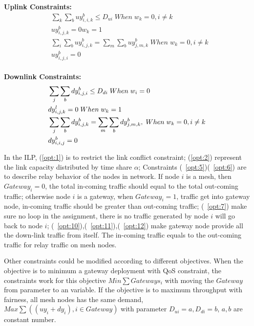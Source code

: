 \noindent
{\bf Uplink Constraints:} 
\begin{align}
\label{opt:3}
& \sum_k \sum_b uy_{i,i,k}^b \leq D_{ui} \; When \; w_k=0, i \neq k \\
\label{opt:4}
& uy_{i,j,k}^b = 0 w_k=1 \\
\label{opt:6}
& \sum_i\sum_b uy_{i,j,k}^b = \sum_m \sum_b uy_{j,m,k}^b \; When \; w_k=0, i \neq k\\
\label{opt:7}
& uy_{i,j,i}^b=0 \\
\end{align}

\noindent
{\bf Downlink Constraints:} 
\begin{align}
{\bf}
\label{opt:8}
& \sum_j \sum_b dy_{i,j,i}^b \leq D_{di} \; When \; w_i=0 \\
\label{opt:9}
& dy_{i,j,k}^l =0 \; When \; w_k=1 \\
\label{opt:11}
& \sum_j\sum_b dy_{i,j,k}^b = \sum_m \sum_b dy_{j,m,k}^b,\;When\; w_k=0,  i \neq k \\
\label{opt:12}
& dy_{i,i,j}^b=0
\end{align}

In the ILP, (\ref{opt:1}) is to restrict the link conflict constraint; (\ref{opt:2}) represent the link capacity distributed by time share $\alpha$; 
Constraints (~\ref{opt:5})(~\ref{opt:6}) are to describe relay behavior of the nodes in network. If node $i$ is a mesh, then $Gateway_i=0$, the total in-coming traffic should equal to the total out-coming traffic; 
otherwise node $i$ is a gateway, when $Gateway_i=1$, traffic get into gateway node, in-coming traffic should be greater than out-coming traffic;
(~\ref{opt:7}) make sure no loop in the assignment, there is no traffic generated by node $i$ will go back to node $i$;
(~\ref{opt:10}),(~\ref{opt:11}),(~\ref{opt:12})
 make gateway node provide all the down-link traffic from itself. The in-coming traffic equals to the out-coming traffic for relay traffic on mesh nodes.



Other constraints could be modified according to different objectives. 
When the objective is to minimum a gateway deployment with QoS constraint, the constraints work for this objective $Min \sum{Gateways_i}$ with moving the $Gateway$ from parameter to an variable.
If the objective is to maximum throughput with fairness, all mesh nodes has the same demand, $Max\sum((uy_i+dy_i),i \in Gateway)$ 
with parameter $D_{ui}=a,D_{di}=b$, $a,b$ are constant number.

